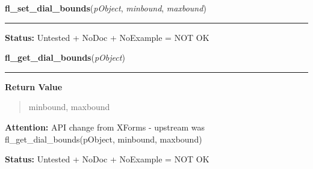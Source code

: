     \label{xformslib:library:fl_set_dial_bounds}

    \vspace{0.5ex}

\hspace{.8\funcindent}\begin{boxedminipage}{\funcwidth}

    \raggedright \textbf{fl\_set\_dial\_bounds}(\textit{pObject}, \textit{minbound}, \textit{maxbound})

    \vspace{-1.5ex}

    \rule{\textwidth}{0.5\fboxrule}
\setlength{\parskip}{2ex}
\setlength{\parskip}{1ex}
\textbf{Status:} Untested + NoDoc + NoExample = NOT OK



    \end{boxedminipage}

    \label{xformslib:library:fl_get_dial_bounds}

    \vspace{0.5ex}

\hspace{.8\funcindent}\begin{boxedminipage}{\funcwidth}

    \raggedright \textbf{fl\_get\_dial\_bounds}(\textit{pObject})

    \vspace{-1.5ex}

    \rule{\textwidth}{0.5\fboxrule}
\setlength{\parskip}{2ex}
\setlength{\parskip}{1ex}
      \textbf{Return Value}
    \vspace{-1ex}

      \begin{quote}
      minbound, maxbound

      \end{quote}

\textbf{Attention:} API change from XForms - upstream was fl\_get\_dial\_bounds(pObject, 
minbound, maxbound)



\textbf{Status:} Untested + NoDoc + NoExample = NOT OK



    \end{boxedminipage}

